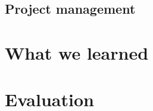 \documentclass{scrartcl}
\begin{document}
    \subsection{Project management}

  \section{What we learned}

  \section{Evaluation}

  \pagebreak
  
  
\end{document}
